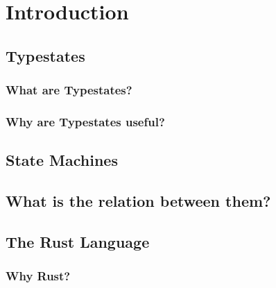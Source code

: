 \chapter{Introduction}\label{cha:introduction}


\section{Typestates}\label{sec:typestates}

\subsection{What are Typestates?}\label{sec:typestates:what-are-typestates}

\subsection{Why are Typestates useful?}\label{sec:typestates:why-are-typestates-useful}

\section{State Machines}\label{sec:state-machines}

\section{What is the relation between them?}\label{sec:ts-fsm-relation}

\section{The Rust Language}\label{sec:rust}

\subsection{Why Rust?}\label{sec:rust:why}